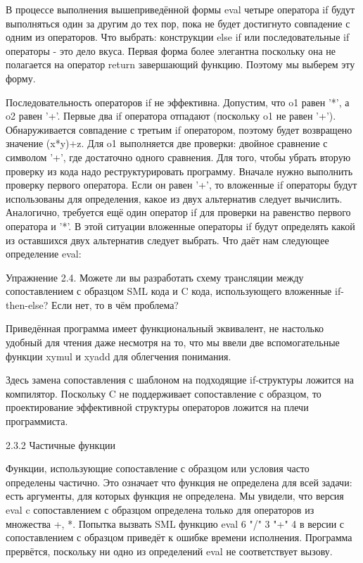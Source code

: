 В процессе выполнения вышеприведённой формы eval четыре оператора if будут выполняться один за другим до тех пор, пока не будет достигнуто совпадение с одним из операторов. Что выбрать: конструкции else if или последовательные if операторы - это дело вкуса. Первая форма более элегантна поскольку она не полагается на оператор return завершающий функцию. Поэтому мы выберем эту форму.

Последовательность операторов if не эффективна. Допустим, что o1 равен '*', а o2 равен '+'. Первые два if оператора отпадают (поскольку o1 не равен '+'). Обнаруживается совпадение с третьим if оператором, поэтому будет возвращено значение (x*y)+z. Для o1 выполняется две проверки: двойное сравнение с символом '+', где достаточно одного сравнения. Для того, чтобы убрать вторую проверку из кода надо реструктурировать программу. Вначале нужно выполнить проверку первого оператора. Если он равен '+', то вложенные if операторы будут использованы для определения, какое из двух альтернатив следует вычислить. Аналогично, требуется ещё один оператор if для проверки на равенство первого оператора и '*'. В этой ситуации вложенные операторы if будут определять какой из оставшихся двух альтернатив следует выбрать. Что даёт нам следующее определение eval:

Упражнение 2.4. Можете ли вы разработать схему трансляции между сопоставлением с образцом SML кода и C кода, использующего вложенные if-then-else? Если нет, то в чём проблема?

Приведённая программа имеет функциональный эквивалент, не настолько удобный для чтения даже несмотря на то, что мы ввели две вспомогательные функции xymul и xyadd для облегчения понимания.

Здесь замена сопоставления с шаблоном на подходящие if-структуры ложится на компилятор. Поскольку C не поддерживает сопоставление с образцом, то проектирование эффективной структуры операторов ложится на плечи программиста.

2.3.2 Частичные функции

Функции, использующие сопоставление с образцом или условия часто определены частично. Это означает что функция не определена для всей задачи: есть аргументы, для которых функция не определена. Мы увидели, что версия eval c сопоставлением с образцом определена только для операторов из множества {+, *}. Попытка вызвать SML функцию eval 6 "/" 3 "+" 4 в версии с сопоставлением с образцом приведёт к ошибке времени исполнения. Программа прервётся, поскольку ни одно из определений eval не соответствует вызову.

